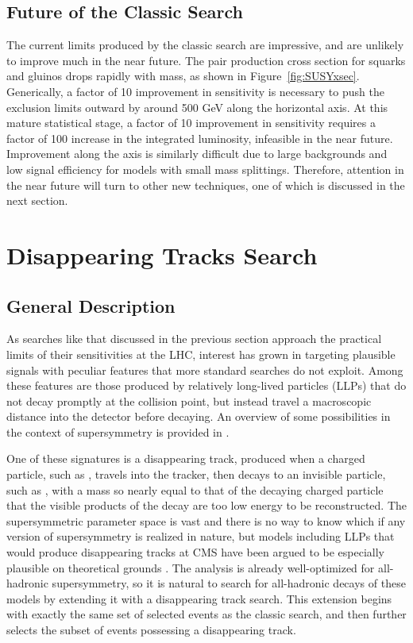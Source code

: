   \subsection{Future of the Classic \mttwo Search} \label{sec:MT2future}

  The current limits produced by the classic \mttwo search are impressive, and are unlikely to improve much in the near future.
  The pair production cross section for squarks and gluinos drops rapidly with mass, as shown in Figure~\ref{fig:SUSYxsec}.
  Generically, a factor of 10 improvement in sensitivity is necessary to push the exclusion limits outward by around 500 GeV along the horizontal axis.
  At this mature statistical stage, a factor of 10 improvement in sensitivity requires a factor of 100 increase in the integrated luminosity, infeasible in the near future.
  Improvement along the \lsp axis is similarly difficult due to large backgrounds and low signal efficiency for models with small mass splittings.
  Therefore, attention in the near future will turn to other new techniques, one of which is discussed in the next section.

\section{Disappearing Tracks Search} \label{sec:distracks}

  \subsection{General Description} \label{sec:distracksdescription}

  As searches like that discussed in the previous section approach the practical limits of their sensitivities at the LHC, interest has grown in targeting plausible signals with peculiar features that more standard searches do not exploit.
  Among these features are those produced by relatively long-lived particles (LLPs) that do not decay promptly at the collision point, but instead travel a macroscopic distance into the detector before decaying. 
  An overview of some possibilities in the context of supersymmetry is provided in \cite{LLPsAtLHC}.

  One of these signatures is a disappearing track, produced when a charged particle, such as \chargino, travels into the tracker, then decays to an invisible particle, such as \lsp, with a mass so nearly equal to that of the decaying charged particle that the visible products of the decay are too low energy to be reconstructed. 
  The supersymmetric parameter space is vast and there is no way to know which if any version of supersymmetry is realized in nature, but models including LLPs that would produce disappearing tracks at CMS have been argued to be especially plausible on theoretical grounds \cite{distracks1, distracksAMSB, AMSBlifetime}.
  The \mttwo analysis is already well-optimized for all-hadronic supersymmetry, so it is natural to search for all-hadronic decays of these models by extending it with a disappearing track search.
  This extension begins with exactly the same set of selected events as the classic search, and then further selects the subset of events possessing a disappearing track.

